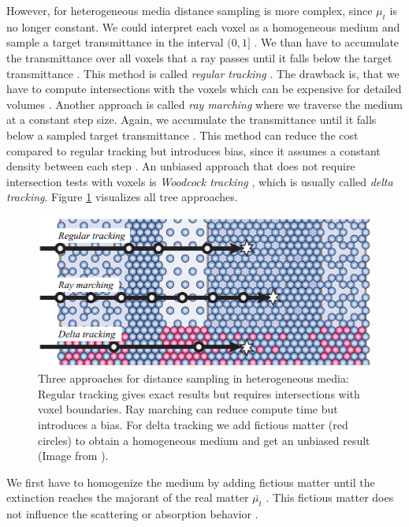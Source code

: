 However, for heterogeneous media distance sampling is more complex, since $\mu_t$ is no longer constant.
We could interpret each voxel as a homogeneous medium and sample a target transmittance in the interval $(0, 1]$ \cite{novak_overview}.
We than have to accumulate the transmittance over all voxels that a ray passes until it falls below the target transmittance \cite{novak_overview}.
This method is called \textit{regular tracking} \cite{sutton_regular_tracking}.
The drawback is, that we have to compute intersections with the voxels which can be expensive for detailed volumes \cite{novak_overview}.
Another approach is called \textit{ray marching} \cite{perlin_hypertexture} where we traverse the medium at a constant step size.
Again, we accumulate the transmittance until it falls below a sampled target transmittance \cite{novak_overview}.
This method can reduce the cost compared to regular tracking but introduces bias, since it assumes a constant density between each step \cite{novak_overview}.
An unbiased approach that does not require intersection tests with voxels is \textit{Woodcock tracking} \cite{woodcock}, which is usually called \textit{delta tracking}.
Figure \ref{fig:novak_distance_sampling} visualizes all tree approaches.
\begin{figure}[ht]
    \centering
    \includegraphics[width=0.7\linewidth]{img/novak_distance_sampling.png}
    \caption[Approaches for distance sampling in heterogeneous media]{Three approaches for distance sampling in heterogeneous media: Regular tracking gives exact results but requires intersections with voxel boundaries. Ray marching can reduce compute time but introduces a bias. For delta tracking we add fictious matter (red circles) to obtain a homogeneous medium and get an unbiased result (Image from \cite{novak_overview}).}
    \label{fig:novak_distance_sampling}
\end{figure}
We first have to homogenize the medium by adding fictious matter until the extinction reaches the majorant of the real matter $\bar{\mu_t}$ \cite{novak_overview}.
This fictious matter does not influence the scattering or absorption behavior \cite{novak_overview}.
